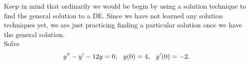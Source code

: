 \documentclass[12pt]{article}
\newcommand{\<}{\langle}
\renewcommand{\>}{\rangle}
\begin{document}
\noindent  Keep in mind that ordinarily
we would be begin by using a solution technique to find the general solution to a DE.  Since we 
have not learned any solution techniques yet, we are just practicing finding a particular solution 
once we have the general solution.\\ %

  Solve
	\[ y'' - y' - 12y = 0, \hspace{0.25cm} y(0) = 4, \hspace{0.25cm} y'(0) = -2. \]
	
%
%
%
\end{document}
